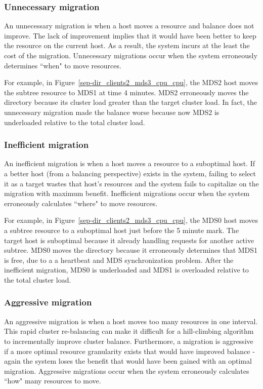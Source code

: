 \subsubsection*{Unnecessary migration}
An unnecessary migration is when a host moves a resource and balance does not improve. The lack of improvement implies that it would have been better to keep the resource on the current host. As a result, the system incurs at the least the cost of the migration. Unnecessary migrations occur when the system erroneously determines ``when" to move resources. 

For example, in Figure~\ref{sep-dir_clients2_mds3_cpu_cpu}, the MDS2 host moves the subtree resource to MDS1 at time 4 minutes. MDS2 erroneously moves the directory because its cluster load greater than the target cluster load. In fact, the unnecessary migration made the balance worse because now MDS2 is underloaded relative to the total cluster load.

\subsubsection*{Inefficient migration}
An inefficient migration is when a host moves a resource to a suboptimal host. If a better host (from a balancing perspective) exists in the system, failing to select it as a target wastes that host's resources and the system fails to capitalize on the migration with maximum benefit. Inefficient migrations occur when the system erroneously calculates ``where" to move resources. 

For example, in Figure~\ref{sep-dir_clients2_mds3_cpu_cpu}, the MDS0 host moves a subtree resource to a suboptimal host just before the 5 minute mark. The target host is suboptimal because it already handling requests for another active subtree. MDS0 moves the directory because it erroneously determines that MDS1 is free, due to a a heartbeat and MDS synchronization problem. After the inefficient migration, MDS0 is underloaded and MDS1 is overloaded relative to the total cluster load.

\subsubsection*{Aggressive migration}
An aggressive migration is when a host moves too many resources in one interval. This rapid cluster re-balancing can make it difficult for a hill-climbing algorithm to incrementally improve cluster balance. Furthermore, a migration is aggressive if a more optimal resource granularity exists that would have improved balance - again the system loses the benefit that would have been gained with an optimal migration. Aggressive migrations occur when the system erroneously calculates ``how" many resources to move. 


